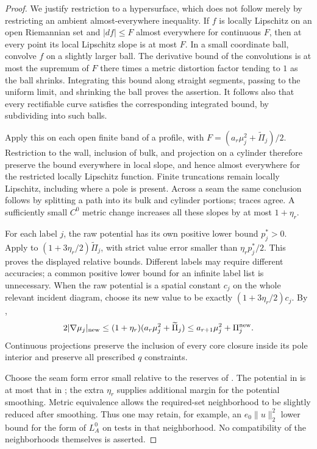 \begin{proof}
We justify restriction to a hypersurface, which does not follow merely
by restricting an ambient almost-everywhere inequality.  If $f$ is
locally Lipschitz on an open Riemannian set and $|df|\le F$ almost
everywhere for continuous $F$, then at every point its local Lipschitz
slope is at most $F$.  In a small coordinate ball, convolve $f$ on a
slightly larger ball.  The derivative bound of the convolutions is at
most the supremum of $F$ there times a metric distortion factor tending
to $1$ as the ball shrinks.  Integrating this bound along straight
segments, passing to the uniform limit, and shrinking the ball proves
the assertion.  It follows also that every rectifiable curve satisfies
the corresponding integrated bound, by subdividing into such balls.

Apply this on each open finite band of a profile, with
$F=(a_r\mu_j^2+\widetilde\Pi_j)/2$.  Restriction to the wall,
inclusion of bulk, and projection on a cylinder therefore preserve the
bound everywhere in local slope, and hence almost everywhere for the
restricted locally Lipschitz function.  Finite truncations remain
locally Lipschitz, including where a pole is present.  Across a seam
the same conclusion follows by splitting a path into its bulk and
cylinder portions; traces agree.  A sufficiently small $C^0$ metric
change increases all these slopes by at most $1+\eta_r$.

For each label $j$, the raw potential has its own positive lower
bound $p_j^*>0$.  Apply  to
$(1+3\eta_r/2)\widetilde\Pi_j$, with strict value error smaller than
$\eta_r p_j^*/2$.  This proves the displayed relative bounds.  Different
labels may require different accuracies; a common positive lower bound
for an infinite label list is unnecessary.  When the raw potential is
a spatial constant $c_j$ on the whole relevant incident diagram, choose
its new value to be exactly $(1+3\eta_r/2)c_j$.  By
,
\[
 2|\nabla\mu_j|_{\rm new}
 \le (1+\eta_r)(a_r\mu_j^2+\widetilde\Pi_j)
 \le a_{r+1}\mu_j^2+\Pi_j^{\rm new}.
\]
Continuous projections preserve the inclusion of every core closure
inside its pole interior and preserve all prescribed $q$ constraints.

Choose the seam form error small relative to the reserves of
.  The potential in  is at
most that in ; the extra $\eta_r$ supplies
additional margin for the potential smoothing.  Metric equivalence
allows the required-set neighborhood to be slightly reduced after
smoothing.  Thus one may retain, for example, an $e_0\|u\|_2^2$
lower bound for the form of $L_A^0$ on tests in that neighborhood.
No compatibility of the neighborhoods themselves is asserted.
\end{proof}

